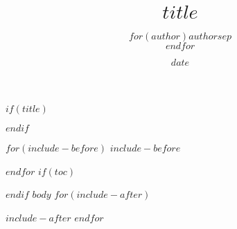 \documentclass{article}
\title{$title$}
\author{$for(author)$$author$$sep$\\$endfor$}
\date{$date$}
\begin{document}
$if(title)$
\maketitle
$endif$

$for(include-before)$
$include-before$

$endfor$
$if(toc)$
\tableofcontents

$endif$
$body$
$for(include-after)$

$include-after$
$endfor$
\end{document}

